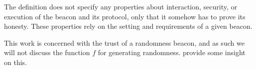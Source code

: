 
The definition does not specify any properties about interaction, security, or execution of the beacon and its protocol, only that it somehow has to prove its honesty.
These properties rely on the setting and requirements of a given beacon.

This work is concerned with the trust of a randomness beacon, and as such we will not discuss the function $f$ for generating randomness. \citet{bonneau2015bitcoin} provide some insight on this.